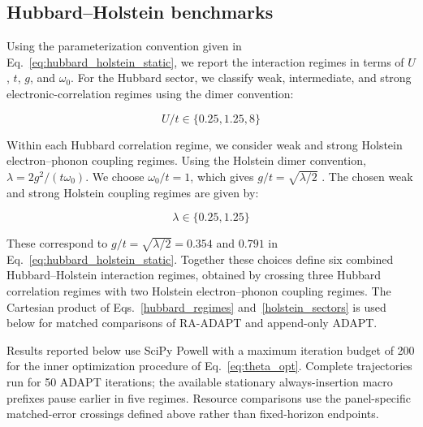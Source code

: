 \documentclass[
  reprint,
  amsmath,
  amssymb,
  aps,
  pra,
  nofootinbib,
  superscriptaddress,
  floatfix
]{revtex4-2}
\begin{document}

\subsection{Hubbard--Holstein benchmarks}
Using the parameterization convention given in Eq.~\eqref{eq:hubbard_holstein_static}, we report the interaction regimes in terms of \(U\), \(t\), \(g\), and \(\omega_0\).
For the Hubbard sector, we classify weak, intermediate, and strong electronic-correlation regimes using the dimer convention:

\begin{equation}
    U/t \in\{0.25,1.25,8\} \label{hubbard_regimes}
\end{equation}

Within each Hubbard correlation regime, we consider weak and strong Holstein electron--phonon coupling regimes. Using the Holstein dimer convention, \(\lambda=2g^2/(t\omega_0)\). We choose \(\omega_0/t=1\), which gives \(g/t=\sqrt{\lambda/2}\) \cite{Sakkinen2015HolsteinDimer}.
The chosen weak and strong Holstein coupling regimes are given by:

\begin{equation}
    \lambda\in\{0.25,1.25\} \label{holstein_sectors}
\end{equation}

These correspond to \(g/t=\sqrt{\lambda/2}=0.354\) and \(0.791\) in Eq.~\eqref{eq:hubbard_holstein_static}. Together these choices define six combined Hubbard--Holstein interaction regimes, obtained by crossing three Hubbard correlation regimes with two Holstein electron--phonon coupling regimes. The Cartesian product of Eqs.~\eqref{hubbard_regimes} and~\eqref{holstein_sectors} is used below for matched comparisons of RA-ADAPT and append-only ADAPT.


Results reported below use SciPy Powell with a maximum iteration budget of 200 for the inner optimization procedure of Eq.~\eqref{eq:theta_opt}. Complete trajectories run for 50 ADAPT iterations; the available stationary always-insertion macro prefixes pause earlier in five regimes. Resource comparisons use the panel-specific matched-error crossings defined above rather than fixed-horizon endpoints.
\end{document}

